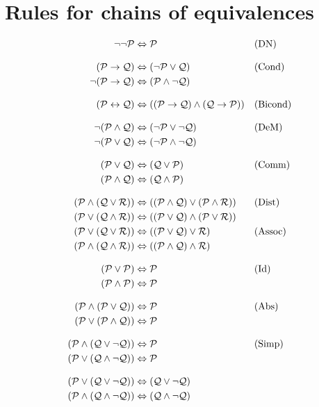 \section{Rules for chains of equivalences}

\ifHTMLtarget
\begin{align*}
\lnot\lnot \mathcal{P} & \Leftrightarrow \mathcal{P} && \text{(DN)}\\[2ex]
(\mathcal{P} \rightarrow \mathcal{Q}) & \Leftrightarrow (\lnot \mathcal{P} \lor \mathcal{Q})
&& \text{(Cond)}\\
\lnot(\mathcal{P} \rightarrow \mathcal{Q}) & \Leftrightarrow (\mathcal{P} \land \lnot\mathcal{Q}) \\[2ex]
(\mathcal{P} \leftrightarrow \mathcal{Q}) & \Leftrightarrow ((\mathcal{P} \rightarrow \mathcal{Q}) \land  (\mathcal{Q} \rightarrow \mathcal{P}))
&& \text{(Bicond)}\\[2ex]
\lnot(\mathcal{P} \land \mathcal{Q}) & \Leftrightarrow (\lnot\mathcal{P} \lor \lnot\mathcal{Q})
&& \text{(DeM)}\\
\lnot(\mathcal{P} \lor \mathcal{Q}) & \Leftrightarrow (\lnot\mathcal{P} \land \lnot\mathcal{Q}) \\[2ex]
(\mathcal{P} \lor \mathcal{Q}) & \Leftrightarrow (\mathcal{Q} \lor \mathcal{P}) & &\text{(Comm)}\\
(\mathcal{P} \land \mathcal{Q}) & \Leftrightarrow (\mathcal{Q} \land \mathcal{P})\\[2ex]
(\mathcal{P} \land (\mathcal{Q} \lor \mathcal{R})) & \Leftrightarrow ((\mathcal{P} \land \mathcal{Q}) \lor (\mathcal{P} \land \mathcal{R}))
&& \text{(Dist)}\\
(\mathcal{P} \lor (\mathcal{Q} \land \mathcal{R})) & \Leftrightarrow ((\mathcal{P} \lor \mathcal{Q}) \land (\mathcal{P} \lor \mathcal{R}))\\
(\mathcal{P} \lor (\mathcal{Q} \lor \mathcal{R})) & \Leftrightarrow ((\mathcal{P} \lor \mathcal{Q}) \lor \mathcal{R}) & &\text{(Assoc)}\\
(\mathcal{P} \land (\mathcal{Q} \land \mathcal{R})) & \Leftrightarrow ((\mathcal{P} \land \mathcal{Q}) \land \mathcal{R})\\[2ex]
(\mathcal{P} \lor \mathcal{P}) & \Leftrightarrow \mathcal{P} && \text{(Id)}\\
(\mathcal{P} \land \mathcal{P}) & \Leftrightarrow \mathcal{P}\\[2ex]
(\mathcal{P} \land (\mathcal{P} \lor \mathcal{Q})) & \Leftrightarrow \mathcal{P}&& \text{(Abs)}\\
(\mathcal{P} \lor (\mathcal{P} \land \mathcal{Q})) & \Leftrightarrow \mathcal{P}\\[2ex]
(\mathcal{P} \land (\mathcal{Q} \lor \lnot\mathcal{Q})) & \Leftrightarrow \mathcal{P}  && \text{(Simp)}\\
(\mathcal{P} \lor (\mathcal{Q} \land \lnot\mathcal{Q})) & \Leftrightarrow \mathcal{P}\\[2ex]
(\mathcal{P} \lor (\mathcal{Q} \lor \lnot\mathcal{Q})) & \Leftrightarrow (\mathcal{Q} \lor \lnot\mathcal{Q}) \\
(\mathcal{P} \land (\mathcal{Q} \land \lnot\mathcal{Q})) & \Leftrightarrow (\mathcal{Q} \land \lnot\mathcal{Q})
\end{align*}
\else

